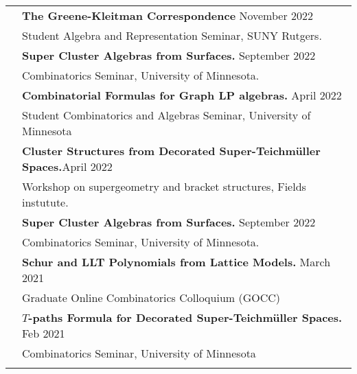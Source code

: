 \documentclass[letterpaper, 11pt,times]{article}
\newcommand{\mycolor}[0]{\color{RoyalBlue}}
\newlength{\myl}
\newcommand{\ind}[0]{\hspace{\myl}}
\newlength{\newl}
\begin{document}
\begin{longtable}{p{1in}p{5in}}
& \textbf{The Greene-Kleitman Correspondence} \hfill November 2022 \\
&\ind  Student Algebra and Representation Seminar, SUNY Rutgers. \\
& \textbf{Super Cluster Algebras from Surfaces.} \hfill September 2022 \\
&\ind  Combinatorics Seminar, University of Minnesota. \\
& \textbf{Combinatorial Formulas for Graph LP algebras.} \hfill April 2022 \\
&\ind  Student Combinatorics and Algebras Seminar, University of Minnesota\\
& \textbf{Cluster Structures from Decorated Super-Teichm\"uller Spaces.}\hfill April 2022\\
&\ind Workshop on supergeometry and bracket structures, Fields instutute.\\
& \textbf{Super Cluster Algebras from Surfaces.} \hfill September 2022 \\
&\ind  Combinatorics Seminar, University of Minnesota. \\

& \textbf{Schur and LLT Polynomials from Lattice Models.} \hfill March 2021 \\
&\ind  Graduate Online Combinatorics Colloquium (GOCC) \\
& \textbf{$T$-paths Formula for Decorated Super-Teichm\"uller Spaces.} \hfill Feb 2021 \\
&\ind  Combinatorics Seminar, University of Minnesota \\

& \\



\end{longtable}
\end{document}
